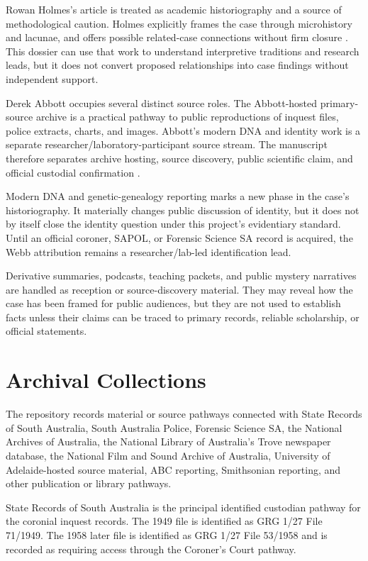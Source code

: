Rowan Holmes's article is treated as academic historiography and a source of methodological caution. Holmes explicitly frames the case through microhistory and lacunae, and offers possible related-case connections without firm closure \parencite{src-src-0014}. This dossier can use that work to understand interpretive traditions and research leads, but it does not convert proposed relationships into case findings without independent support.

Derek Abbott occupies several distinct source roles. The Abbott-hosted primary-source archive is a practical pathway to public reproductions of inquest files, police extracts, charts, and images. Abbott's modern DNA and identity work is a separate researcher/laboratory-participant source stream. The manuscript therefore separates archive hosting, source discovery, public scientific claim, and official custodial confirmation \parencite{src-src-0005,m11-m11-src-0003,m11-m11-src-0009}.

Modern DNA and genetic-genealogy reporting marks a new phase in the case's historiography. It materially changes public discussion of identity, but it does not by itself close the identity question under this project's evidentiary standard. Until an official coroner, SAPOL, or Forensic Science SA record is acquired, the Webb attribution remains a researcher/lab-led identification lead.

Derivative summaries, podcasts, teaching packets, and public mystery narratives are handled as reception or source-discovery material. They may reveal how the case has been framed for public audiences, but they are not used to establish facts unless their claims can be traced to primary records, reliable scholarship, or official statements.

\section{Archival Collections}

The repository records material or source pathways connected with State Records of South Australia, South Australia Police, Forensic Science SA, the National Archives of Australia, the National Library of Australia's Trove newspaper database, the National Film and Sound Archive of Australia, University of Adelaide-hosted source material, ABC reporting, Smithsonian reporting, and other publication or library pathways.

State Records of South Australia is the principal identified custodian pathway for the coronial inquest records. The 1949 file is identified as GRG 1/27 File 71/1949. The 1958 later file is identified as GRG 1/27 File 53/1958 and is recorded as requiring access through the Coroner's Court pathway.

